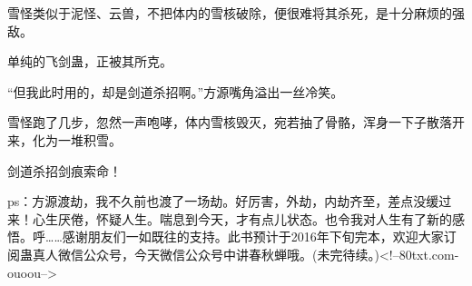 \begin{this_body}
雪怪类似于泥怪、云兽，不把体内的雪核破除，便很难将其杀死，是十分麻烦的强敌。

单纯的飞剑蛊，正被其所克。

“但我此时用的，却是剑道杀招啊。”方源嘴角溢出一丝冷笑。

雪怪跑了几步，忽然一声咆哮，体内雪核毁灭，宛若抽了骨骼，浑身一下子散落开来，化为一堆积雪。

剑道杀招剑痕索命！

ps：方源渡劫，我不久前也渡了一场劫。好厉害，外劫，内劫齐至，差点没缓过来！心生厌倦，怀疑人生。喘息到今天，才有点儿状态。也令我对人生有了新的感悟。呼……感谢朋友们一如既往的支持。此书预计于2016年下旬完本，欢迎大家订阅蛊真人微信公众号，今天微信公众号中讲春秋蝉哦。(未完待续。)<!--80txt.com-ouoou-->

\end{this_body}


